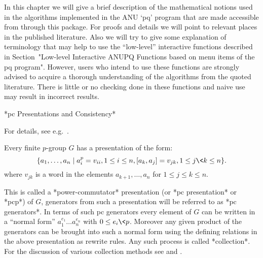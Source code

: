 

In this chapter  we will give a brief  description of the mathematical
notions used  in the  algorithms implemented in  the ANU  `pq' program
that are made accessible from  {\GAP} through this package. For proofs
and  details  we  will  point  to relevant  places  in  the  published
literature. Also we  will try to give some  explanation of terminology
that may help to use the ``low-level'' interactive functions described
in Section~"Low-level Interactive ANUPQ  Functions based on menu items
of the pq program".  However,  users who intend to use these functions
are  strongly  advised to  acquire  a  thorough  understanding of  the
algorithms from the quoted literature.  There is little or no checking
done in these functions and naive use may result in incorrect results.


*pc Presentations and Consistency*

For details, see e.g.~\cite{NNN98}.

Every finite $p$-group $G$ has a presentation of the form: 
$$
\{a_1,\dots,a_n \mid a_i^p = v_{ii}, 1 \le i \le n, 
               [a_k, a_j] = v_{jk}, 1 \le j \< k \le n \}.  
$$
where $v_{jk}$ is a word in the elements $a_{k+1},\dots,a_n$ for 
$1 \le j \leq k \le n$.

This is called a *power-commutator* presentation (or *pc presentation*
or *pcp*) of $G$, generators from such a presentation will be referred
to as *pc generators*. In terms of such pc generators every element of
$G$ can  be written  in a ``normal  form'' $a_1^{e_1}\dots a_n^{e_n}$
with $0  \le e_i \< p$.  Moreover any given product  of the generators
can be brought into such a normal form using the defining relations in
the above presentation  as rewrite rules.  Any such  process is called
*collection*.  For the  discussion of  various collection  methods see
\cite{LGS90} and \cite{VL90a}.

